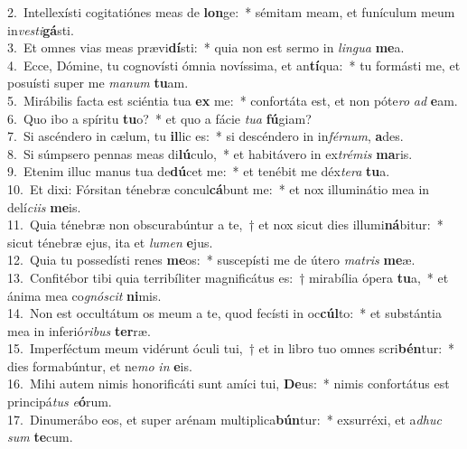 {2.~}Intellexísti cogitatiónes meas de \textbf{lon}ge:~* sémitam meam, et funículum meum in\textit{ve}\textit{sti}\textbf{gá}sti.\\
{3.~}Et omnes vias meas prævi\textbf{dí}sti:~* quia non est sermo in \textit{lin}\textit{gua} \textbf{me}a.\\
{4.~}Ecce, Dómine, tu cognovísti ómnia novíssima, et an\textbf{tí}qua:~* tu formásti me, et posuísti super me \textit{ma}\textit{num} \textbf{tu}am.\\
{5.~}Mirábilis facta est sciéntia tua \textbf{ex} me:~* confortáta est, et non póte\textit{ro} \textit{ad} \textbf{e}am.\\
{6.~}Quo ibo a spíritu \textbf{tu}o?~* et quo a fácie \textit{tu}\textit{a} \textbf{fú}giam?\\
{7.~}Si ascéndero in cælum, tu \textbf{il}lic es:~* si descéndero in in\textit{fér}\textit{num}, \textbf{a}des.\\
{8.~}Si súmpsero pennas meas di\textbf{lú}culo,~* et habitávero in ex\textit{tré}\textit{mis} \textbf{ma}ris.\\
{9.~}Etenim illuc manus tua de\textbf{dú}cet me:~* et tenébit me déx\textit{te}\textit{ra} \textbf{tu}a.\\
{10.~}Et dixi: Fórsitan ténebræ concul\textbf{cá}bunt me:~* et nox illuminátio mea in delí\textit{ci}\textit{is} \textbf{me}is.\\
{11.~}Quia ténebræ non obscurabúntur a te,~† et nox sicut dies illumi\textbf{ná}bitur:~* sicut ténebræ ejus, ita et \textit{lu}\textit{men} \textbf{e}jus.\\
{12.~}Quia tu possedísti renes \textbf{me}os:~* suscepísti me de útero \textit{ma}\textit{tris} \textbf{me}æ.\\
{13.~}Confitébor tibi quia terribíliter magnificátus es:~† mirabília ópera \textbf{tu}a,~* et ánima mea co\textit{gnó}\textit{scit} \textbf{ni}mis.\\
{14.~}Non est occultátum os meum a te, quod fecísti in oc\textbf{cúl}to:~* et substántia mea in inferió\textit{ri}\textit{bus} \textbf{ter}ræ.\\
{15.~}Imperféctum meum vidérunt óculi tui,~† et in libro tuo omnes scri\textbf{bén}tur:~* dies formabúntur, et ne\textit{mo} \textit{in} \textbf{e}is.\\
{16.~}Mihi autem nimis honorificáti sunt amíci tui, \textbf{De}us:~* nimis confortátus est principá\textit{tus} \textit{e}\textbf{ó}rum.\\
{17.~}Dinumerábo eos, et super arénam multiplica\textbf{bún}tur:~* exsurréxi, et a\textit{dhuc} \textit{sum} \textbf{te}cum.\\
